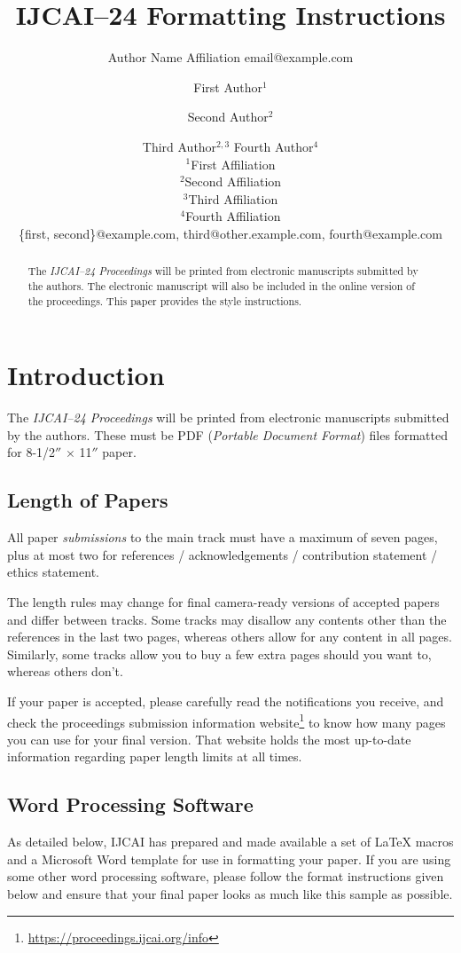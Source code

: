 \documentclass{article}
\title{IJCAI--24 Formatting Instructions}
\author{
    Author Name
    \affiliations
    Affiliation
    \emails
    email@example.com
}
\author{
First Author$^1$
\and
Second Author$^2$\and
Third Author$^{2,3}$\And
Fourth Author$^4$\\
\affiliations
$^1$First Affiliation\\
$^2$Second Affiliation\\
$^3$Third Affiliation\\
$^4$Fourth Affiliation\\
\emails
\{first, second\}@example.com,
third@other.example.com,
fourth@example.com
}
\begin{document}
\maketitle

\begin{abstract}
    The {\it IJCAI--24 Proceedings} will be printed from electronic
    manuscripts submitted by the authors. The electronic manuscript will
    also be included in the online version of the proceedings. This paper
    provides the style instructions.
\end{abstract}

\section{Introduction}

The {\it IJCAI--24 Proceedings} will be printed from electronic
manuscripts submitted by the authors. These must be PDF ({\em Portable
        Document Format}) files formatted for 8-1/2$''$ $\times$ 11$''$ paper.

\subsection{Length of Papers}


All paper {\em submissions} to the main track must have a maximum of seven pages, plus at most two for references / acknowledgements / contribution statement / ethics statement.

The length rules may change for final camera-ready versions of accepted papers and
differ between tracks. Some tracks may disallow any contents other than the references in the last two pages, whereas others allow for any content in all pages. Similarly, some tracks allow you to buy a few extra pages should you want to, whereas others don't.

If your paper is accepted, please carefully read the notifications you receive, and check the proceedings submission information website\footnote{\url{https://proceedings.ijcai.org/info}} to know how many pages you can use for your final version. That website holds the most up-to-date information regarding paper length limits at all times.


\subsection{Word Processing Software}

As detailed below, IJCAI has prepared and made available a set of
\LaTeX{} macros and a Microsoft Word template for use in formatting
your paper. If you are using some other word processing software, please follow the format instructions given below and ensure that your final paper looks as much like this sample as possible.
\end{document}
